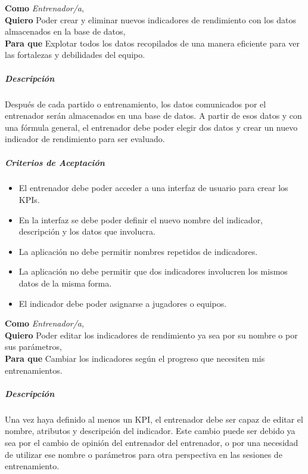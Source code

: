 \begin{tcolorbox}[title=Historia de Usuario 2: Creación de nuevos KPIs]
\textbf{Como} \textit{Entrenador/a},\\
\textbf{Quiero} Poder crear y eliminar nuevos indicadores de rendimiento con los datos almacenados en la base de datos,\\
\textbf{Para que} Explotar todos los datos recopilados de una manera eficiente para ver las fortalezas y debilidades del equipo.
\end{tcolorbox}

\subparagraph{Descripción}
Después de cada partido o entrenamiento, los datos comunicados por el entrenador serán almacenados en una base de datos. A partir de esos datos y con una fórmula general, el entrenador debe poder elegir dos datos y crear un nuevo indicador de rendimiento para ser evaluado.

\subparagraph{Criterios de Aceptación}
\begin{itemize}
    \item El entrenador debe poder acceder a una interfaz de usuario para crear los KPIs.
    \item En la interfaz se debe poder definir el nuevo nombre del indicador, descripción y los datos que involucra.
    \item La aplicación no debe permitir nombres repetidos de indicadores.
    \item La aplicación no debe permitir que dos indicadores involucren los mismos datos de la misma forma.
    \item El indicador debe poder asignarse a jugadores o equipos.
\end{itemize}

\begin{tcolorbox}[title=Historia de Usuario 3: Edición de KPIs]
\textbf{Como} \textit{Entrenador/a},\\
\textbf{Quiero} Poder editar los indicadores de rendimiento ya sea por su nombre o por sus parámetros,\\
\textbf{Para que} Cambiar los indicadores según el progreso que necesiten mis entrenamientos.
\end{tcolorbox}

\subparagraph{Descripción}
Una vez haya definido al menos un KPI, el entrenador debe ser capaz de editar el nombre, atributos y descripción del indicador. Este cambio puede ser debido ya sea por el cambio de opinión del entrenador del entrenador, o por una necesidad de utilizar ese nombre o parámetros para otra perspectiva en las sesiones de entrenamiento.

